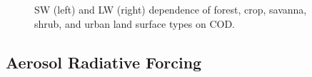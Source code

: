 \documentclass[12pt]{article}
\begin{document}
\begin{figure}[h!]
\begin{center}

        \end{center}
        \caption{SW (left) and LW (right) dependence of forest, crop, savanna, shrub, and urban land surface types on COD.}
    \end{figure}


    \subsection{Aerosol Radiative Forcing}
\end{document}
